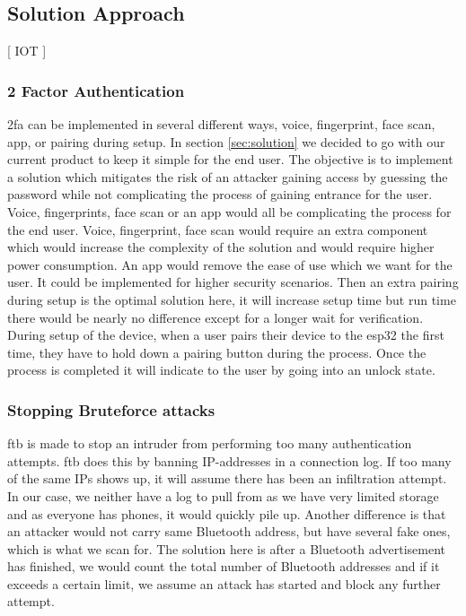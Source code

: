 \subsection{Solution Approach}
[ IOT ]
\subsubsection{2 Factor Authentication}
\gls{2fa} can be implemented in several different ways, voice, fingerprint, face scan, app, or pairing during setup. In section \ref{sec:solution} we decided to go with our current product to keep it simple for the end user. The objective is to implement a solution which mitigates the risk of an attacker gaining access by guessing the password while not complicating the process of gaining entrance for the user. Voice, fingerprints, face scan or an app would all be complicating the process for the end user. Voice, fingerprint, face scan would require an extra component which would increase the complexity of the solution and would require higher power consumption. An app would remove the ease of use which we want for the user. It could be implemented for higher security scenarios. Then an extra pairing during setup is the optimal solution here, it will increase setup time but run time there would be nearly no difference except for a longer wait for verification. During setup of the device, when a user pairs their device to the esp32 the first time, they have to hold down a pairing button during the process. Once the process is completed it will indicate to the user by going into an unlock state.

\subsubsection{Stopping Bruteforce attacks}
\gls{ftb} is made to stop an intruder from performing too many authentication attempts\cite{f2b}. \gls{ftb} does this by banning IP-addresses in a connection log\cite{f2bHowTo}. If too many of the same IPs shows up, it will assume there has been an infiltration attempt. In our case, we neither have a log to pull from as we have very limited storage and as everyone has phones, it would quickly pile up. Another difference is that an attacker would not carry same Bluetooth address, but have several fake ones, which is what we scan for. The solution here is after a Bluetooth advertisement has finished, we would count the total number of Bluetooth addresses and if it exceeds a certain limit, we assume an attack has started and block any further attempt.

